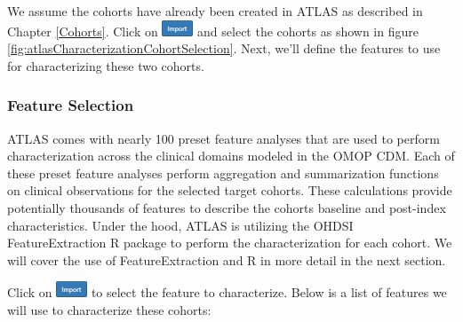 \documentclass[11pt]{book}
\theoremstyle{definition}
\theoremstyle{definition}
\theoremstyle{definition}
\theoremstyle{remark}
\begin{document}
We assume the cohorts have already been created in ATLAS as described in Chapter \ref{Cohorts}. Click on \includegraphics{images/Characterization/atlasImportButton.png} and select the cohorts as shown in figure \ref{fig:atlasCharacterizationCohortSelection}. Next, we'll define the features to use for characterizing these two cohorts.

\hypertarget{feature-selection}{%
\subsubsection*{Feature Selection}\label{feature-selection}}

ATLAS comes with nearly 100 preset feature analyses that are used to perform characterization across the clinical domains modeled in the OMOP CDM. Each of these preset feature analyses perform aggregation and summarization functions on clinical observations for the selected target cohorts. These calculations provide potentially thousands of features to describe the cohorts baseline and post-index characteristics. Under the hood, ATLAS is utilizing the OHDSI FeatureExtraction R package to perform the characterization for each cohort. We will cover the use of FeatureExtraction and R in more detail in the next section. 

Click on \includegraphics{images/Characterization/atlasImportButton.png} to select the feature to characterize. Below is a list of features we will use to characterize these cohorts:
\end{document}
